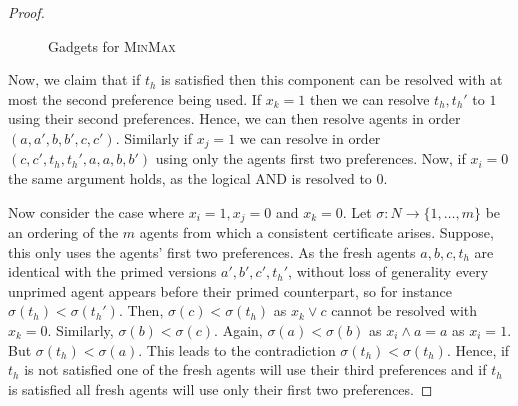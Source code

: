 \documentclass[11pt,a4paper, titlepage]{article}
\theoremstyle{definition}
\begin{document}
\begin{proof}
\begin{figure}
{{
    }}
    \caption{Gadgets for \textsc{MinMax}}
    \end{figure}

    Now, we claim that if $t_h$ is satisfied then this component can be resolved with at most the second preference being used. 
    If $x_k = 1$ then we can resolve $t_h, t_h'$ to $1$ using their second preferences. 
    Hence, we can then resolve agents in order $(a, a', b, b', c, c')$. 
    Similarly if $x_j = 1$ we can resolve in order $(c, c', t_h, t_h', a, a, b, b')$ using only the agents first two preferences. 
    Now, if $x_i = 0$ the same argument holds, as the logical AND is resolved to 0. 

    Now consider the case where $x_i = 1, x_j = 0$ and $x_k = 0$. Let $\sigma \colon N \longrightarrow \{1, \ldots, m\}$ be an ordering of the $m$ agents from which a consistent certificate arises. Suppose, this only uses the agents' first two preferences.
    As the fresh agents $a, b, c, t_h$ are identical with the primed versions $a', b', c', t_h'$, without loss of generality every unprimed agent appears before their primed counterpart, so for instance $\sigma(t_h) < \sigma(t_h')$. 
    Then, $\sigma(c) < \sigma(t_h)$ as $x_k \lor c$ cannot be resolved with $x_k = 0$. 
    Similarly, $\sigma(b) < \sigma(c)$. Again, $ \sigma(a) < \sigma(b)$ as $x_i \land a = a$ as $x_i = 1$. But $\sigma(t_h) < \sigma(a)$. This leads to the contradiction $\sigma(t_h) < \sigma(t_h)$. 
    Hence, if $t_h$ is not satisfied one of the fresh agents will use their third preferences and if $t_h$ is satisfied all fresh agents will use only their first two preferences.


\end{proof}
\end{document}
